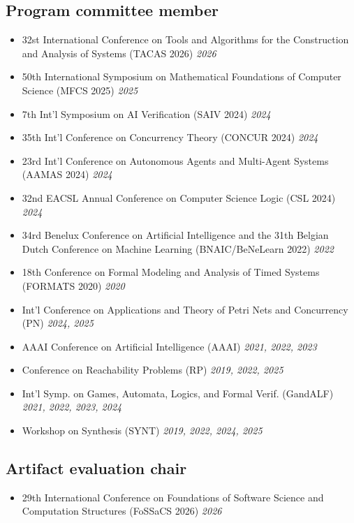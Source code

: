 \documentclass[10pt,a4paper]{moderncv}
\begin{document}
\subsection{Program committee member}
\begin{itemize}
  \item 32st International Conference on Tools and Algorithms for the
    Construction and Analysis of Systems (TACAS 2026) \hfill \textit{2026}
  \item 50th International Symposium on Mathematical Foundations of Computer
    Science (MFCS 2025) \hfill \textit{2025}
  \item 7th Int'l Symposium on AI Verification (SAIV 2024) \hfill
    \textit{2024}
  \item 35th Int'l Conference on Concurrency Theory (CONCUR 2024) \hfill
    \textit{2024}
  \item 23rd Int'l Conference on Autonomous Agents and Multi-Agent
    Systems (AAMAS 2024) \hfill \textit{2024}
  \item 32nd EACSL Annual Conference on Computer Science Logic (CSL 2024)
    \hfill \textit{2024}
  \item 34rd Benelux Conference on Artificial Intelligence and the 31th
    Belgian Dutch Conference on Machine Learning (BNAIC/BeNeLearn 2022) \hfill \textit{2022}
  \item 18th Conference on Formal Modeling and Analysis of Timed
    Systems (FORMATS 2020) \hfill \textit{2020}
  \item Int'l Conference on Applications and Theory of Petri Nets
    and Concurrency (PN) \hfill \textit{2024, 2025}
  \item AAAI Conference on Artificial Intelligence (AAAI) \hfill
    \textit{2021, 2022, 2023}
  \item Conference on Reachability Problems (RP) \hfill \textit{2019, 2022,
    2025}
  \item Int'l Symp. on Games, Automata, Logics, and Formal
    Verif. (GandALF) \hfill \textit{2021, 2022, 2023, 2024}
  \item Workshop on Synthesis (SYNT) \hfill \textit{2019, 2022, 2024, 2025}
\end{itemize}

\subsection{Artifact evaluation chair}
\begin{itemize}
  \item 29th International Conference on Foundations of Software Science and
    Computation Structures (FoSSaCS 2026) \hfill \textit{2026}
\end{itemize}
\end{document}
